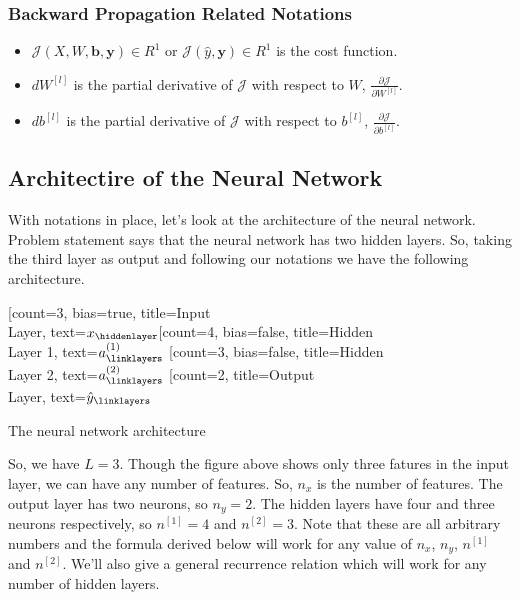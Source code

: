 \documentclass[12pt]{article}
\begin{document}
\subsubsection{Backward Propagation Related Notations}
\begin{itemize}
    \item
          \(\mathcal{J}(X, W, \mathbf{b}, \mathbf{y})\in R^1\) or
          \(\mathcal{J}(\hat{y}, \mathbf{y}) \in R^1\) is the cost function.
    \item
          \(d{W^{[l]}}\) is the partial derivative of \(\mathcal{J}\) with
          respect to \(W\), \(\frac{\partial{\mathcal{J}}}{\partial W^{[l]}}\).
    \item
          \(d{b^{[l]}}\) is the partial derivative of \(\mathcal{J}\) with
          respect to \(b^{[l]}\), \(\frac{\partial{\mathcal{J}}}{\partial b^{[l]}}\).
\end{itemize}

\subsection{Architectire of the Neural Network}
With notations in place, let's look at the architecture of the neural network. Problem statement says that the neural network has two hidden layers. So, taking the third layer as output and following our notations we have the following architecture.

\begin{neuralnetwork}[height=4]
    \newcommand{\x}[2]{$x_#2$}
    \newcommand{\y}[2]{$\hat{y}_#2$}
    \newcommand{\hfirst}[2]{\small $a^{(1)}_#2$}
    \newcommand{\hsecond}[2]{\small $a^{(2)}_#2$}
    [count=3, bias=true, title=Input\\Layer, text=\x]
    \hiddenlayer[count=4, bias=false, title=Hidden\\Layer 1, text=\hfirst] \linklayers
    \hiddenlayer[count=3, bias=false, title=Hidden\\Layer 2, text=\hsecond] \linklayers
    \outputlayer[count=2, title=Output\\Layer, text=\y] \linklayers
\end{neuralnetwork}
\begin{center}
    The neural network architecture
\end{center}
So, we have $L=3$. Though the figure above shows only three fatures in the input layer, we can have any number of features. So, \(n_x\) is the number of features. The output layer has two neurons, so \(n_y=2\). The hidden layers have four and three neurons respectively, so \(n^{[1]}=4\) and \(n^{[2]}=3\). Note that these are all arbitrary numbers and the formula derived below will work for any value of $n_x$, $n_y$, $n^{[1]}$ and $n^{[2]}$. We'll also give a general recurrence relation which will work for any number of hidden layers.
\end{document}
